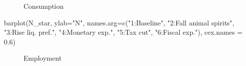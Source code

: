\documentclass[
  letterpaper,
  DIV=11,
  numbers=noendperiod]{scrreprt}
\newenvironment{Shaded}{\begin{snugshade}}{\end{snugshade}}
\newcommand{\AttributeTok}[1]{\textcolor[rgb]{0.40,0.45,0.13}{#1}}
\newcommand{\FloatTok}[1]{\textcolor[rgb]{0.68,0.00,0.00}{#1}}
\newcommand{\FunctionTok}[1]{\textcolor[rgb]{0.28,0.35,0.67}{#1}}
\newcommand{\NormalTok}[1]{\textcolor[rgb]{0.00,0.23,0.31}{#1}}
\newcommand{\StringTok}[1]{\textcolor[rgb]{0.13,0.47,0.30}{#1}}
\begin{document}
\begin{figure}[H]


\caption{\label{fig-C}Consumption}

\end{figure}%

\begin{Shaded}
\begin{Highlighting}[]
\FunctionTok{barplot}\NormalTok{(N\_star, }\AttributeTok{ylab=}\StringTok{"N"}\NormalTok{, }\AttributeTok{names.arg=}\FunctionTok{c}\NormalTok{(}\StringTok{"1:Baseline"}\NormalTok{, }\StringTok{"2:Fall animal spirits"}\NormalTok{, }\StringTok{"3:Rise liq. pref."}\NormalTok{, }\StringTok{"4:Monetary exp."}\NormalTok{, }\StringTok{"5:Tax cut"}\NormalTok{, }\StringTok{"6:Fiscal exp."}\NormalTok{), }\AttributeTok{cex.names =} \FloatTok{0.6}\NormalTok{)}
\end{Highlighting}
\end{Shaded}

\begin{figure}[H]


\caption{\label{fig-N}Employment}

\end{figure}%
\end{document}
